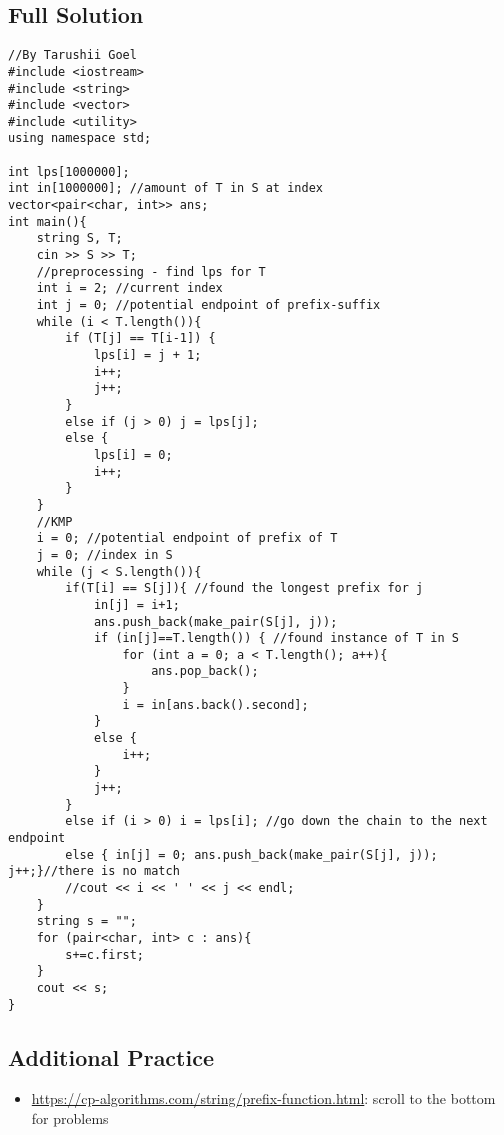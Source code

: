 \documentclass{article}
\begin{document}
\subsection{Full Solution}

\begin{lstlisting}
//By Tarushii Goel
#include <iostream>
#include <string>
#include <vector>
#include <utility>
using namespace std;

int lps[1000000];
int in[1000000]; //amount of T in S at index
vector<pair<char, int>> ans;
int main(){
	string S, T;
	cin >> S >> T;
	//preprocessing - find lps for T
	int i = 2; //current index
	int j = 0; //potential endpoint of prefix-suffix
	while (i < T.length()){
		if (T[j] == T[i-1]) {
			lps[i] = j + 1;
			i++;
			j++;
		}
		else if (j > 0) j = lps[j];
		else {
			lps[i] = 0;
			i++;
		}
	}
	//KMP
	i = 0; //potential endpoint of prefix of T
	j = 0; //index in S
	while (j < S.length()){
		if(T[i] == S[j]){ //found the longest prefix for j 
			in[j] = i+1; 
			ans.push_back(make_pair(S[j], j));
			if (in[j]==T.length()) { //found instance of T in S
				for (int a = 0; a < T.length(); a++){
					ans.pop_back();
				}
				i = in[ans.back().second];
			}
			else {
				i++;
			}	
			j++;
		}
		else if (i > 0) i = lps[i]; //go down the chain to the next endpoint
		else { in[j] = 0; ans.push_back(make_pair(S[j], j)); j++;}//there is no match
		//cout << i << ' ' << j << endl;
	}
	string s = "";
	for (pair<char, int> c : ans){
		s+=c.first;
	}
	cout << s;
}
\end{lstlisting}

\subsection{Additional Practice}
\begin{itemize}
\item \url{https://cp-algorithms.com/string/prefix-function.html}: scroll to the bottom for problems
\end{itemize}
\end{document}

